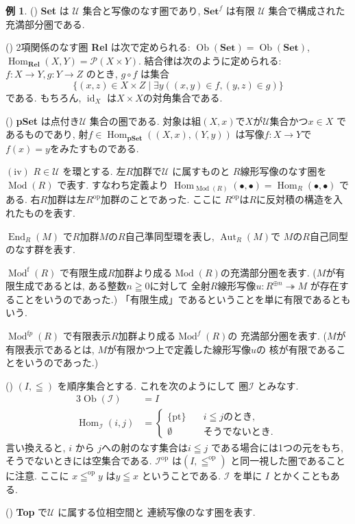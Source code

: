 \documentclass[a5paper, dvipdfmx]{jsbook}
\theoremstyle{definition}
\newtheorem{Example}[Axiom]{例}
\newcommand{\mcal}{\mathcal}
\newcommand{\mrm}{\mathrm}
\newcommand{\id}{\mathop{\mathrm{id}}\nolimits} %
\newcommand{\Ob}{\mathop{\mathrm{Ob}}\nolimits}
\numberwithin{equation}{section} %
\newcommand{\Hom}{\mathop{\mathrm{Hom}}\nolimits}
\newcommand{\Mod}{\mathop{\mathrm{Mod}}\nolimits}
\newcommand{\End}{\mathop{\mathrm{End}}\nolimits}
\newcommand{\Aut}{\mathop{\mathrm{Aut}}\nolimits}
\def\rnum#1{\expandafter{\romannumeral #1}}
\begin{document}
\begin{Example}

  (\rnum{1}) %
  \textbf{Set} は $\mcal{U}$ 集合と写像のなす圏であり, 
  $\textbf{Set}^f$ は有限 $\mcal{U}$ 集合で構成された
  充満部分圏である. 

  (\rnum{2}) %
  2項関係のなす圏 {\textbf{Rel}} は次で定められる: 
  $\Ob(\mcal{\textbf{Set}})=\Ob(\mcal{\textbf{Set}})$, 
  $\Hom_{\textbf{Rel}}(X,Y) = \mcal{P}(X\times Y)$.
  結合律は次のように定められる: 
  $f:X\to Y, g:Y\to Z$ のとき, $g\circ f$ は集合
  \[
    \{(x,z)\in X\times Z\mid\exists y\left((x,y)\in f, (y,z)\in g\right)\}
  \]
  である. もちろん, $\id_X$ は$X\times X$の対角集合である. 

  (\rnum{3}) %
  {\textbf{pSet}} は点付き$\mcal{U}$ 集合の圏である. 
  対象は組$(X,x)$で$X$が$\mcal{U}$集合かつ$x\in X$ 
  であるものであり, 射$f\in \Hom_{\textbf{pSet}}((X,x),(Y,y))$
  は写像$f:X\to Y$で$f(x)=y$をみたすものである. 

  $(\mathrm{iv})$ %
  $R\in \mcal{U}$ を環とする. 左$R$加群で$\mcal{U}$ に属すものと
  $R$線形写像のなす圏を$\Mod(R)$ で表す. すなわち定義より 
  $\Hom_{\Mod(R)}(\bullet,\bullet)=\Hom_R(\bullet,\bullet)$
  である. 右$R$加群は左$R^{\mrm{op}}$加群のことであった. ここに
  $R^{\mrm{op}}$は$R$に反対積の構造を入れたものを表す. 

  $\End_R(M)$ で$R$加群$M$の$R$自己準同型環を表し, $\Aut_R(M)$で
  $M$の$R$自己同型のなす群を表す. 

  $\Mod^{\mrm f}(R)$ で有限生成$R$加群より成る$\Mod(R)$の充満部分圏を表す. 
  ($M$が有限生成であるとは, ある整数$n\geqq 0$に対して
  全射$R$線形写像$u:R^{\oplus n}\twoheadrightarrow M$ 
  が存在することをいうのであった.) 
  「有限生成」であるということを単に有限であるともいう. 

  $\Mod^{\mrm fp}(R)$ で有限表示$R$加群より成る$\Mod^f(R)$の
  充満部分圏を表す. 
  ($M$が有限表示であるとは, $M$が有限かつ上で定義した線形写像$u$の
  核が有限であることをいうのであった.)

  (\rnum{5}) %
  $(I,\leqq)$ を順序集合とする. これを次のようにして
  圏$\mcal{I}$ とみなす. 
  \begin{alignat*}{3}
    \Ob(\mcal{I}) &= I \\
    \Hom_\mcal{I}(i,j) &= 
    \begin{cases}
      \{\mathrm{pt}\} \quad & i\leqq j\text{のとき, }\\
      \emptyset       \quad & \text{そうでないとき. }
    \end{cases}
  \end{alignat*}
  言い換えると, $i$ から $j$への射のなす集合は$i\leqq j$
  である場合には1つの元をもち, そうでないときには空集合である. 
  $\mcal{I}^\mathrm{op}$ は$(I,\leqq^\mathrm{op})$ 
  と同一視した圏であることに注意. ここに
  $x\leqq^\mathrm{op} y$ は$y \leqq x$ ということである. 
  $\mcal{I}$ を単に $I$ とかくこともある. 

  (\rnum{6}) %
  \textbf{Top} で$\mcal{U}$ に属する位相空間と
  連続写像のなす圏を表す. 
\end{Example}
\end{document}
